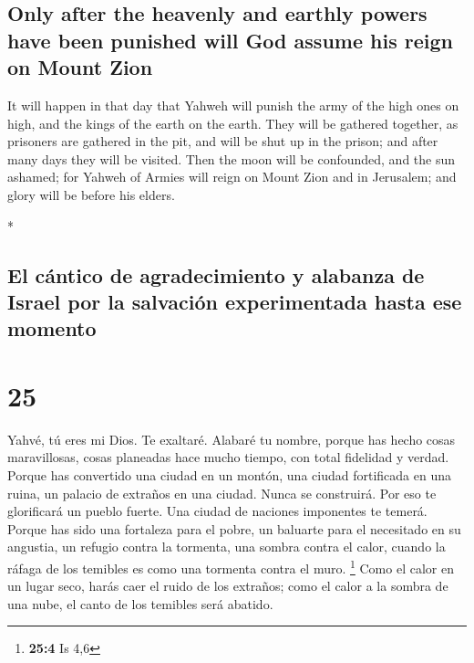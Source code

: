\begin{paracol}{2}
\begin{otherlanguage}{english}
\hypertarget{only-after-the-heavenly-and-earthly-powers-have-been-punished-will-god-assume-his-reign-on-mount-zion}{%
\subsection{Only after the heavenly and earthly powers have been
punished will God assume his reign on Mount
Zion}\label{only-after-the-heavenly-and-earthly-powers-have-been-punished-will-god-assume-his-reign-on-mount-zion}}

 It will happen in that day that Yahweh will punish the
army of the high ones on high, and the kings of the earth on the earth.
 They will be gathered together, as prisoners are
gathered in the pit, and will be shut up in the prison; and after many
days they will be visited.  Then the moon will be
confounded, and the sun ashamed; for Yahweh of Armies will reign on
Mount Zion and in Jerusalem; and glory will be before his elders.

\end{otherlanguage}

\switchcolumn[0]*

\hypertarget{el-cuxe1ntico-de-agradecimiento-y-alabanza-de-israel-por-la-salvaciuxf3n-experimentada-hasta-ese-momento}{%
\subsection{El cántico de agradecimiento y alabanza de Israel por la
salvación experimentada hasta ese
momento}\label{el-cuxe1ntico-de-agradecimiento-y-alabanza-de-israel-por-la-salvaciuxf3n-experimentada-hasta-ese-momento}}

\hypertarget{section-48}{%
\section{25}\label{section-48}}

 Yahvé, tú eres mi Dios. Te exaltaré. Alabaré tu nombre,
porque has hecho cosas maravillosas, cosas planeadas hace mucho tiempo,
con total fidelidad y verdad.  Porque has convertido una
ciudad en un montón, una ciudad fortificada en una ruina, un palacio de
extraños en una ciudad. Nunca se construirá.  Por eso te
glorificará un pueblo fuerte. Una ciudad de naciones imponentes te
temerá.  Porque has sido una fortaleza para el pobre, un
baluarte para el necesitado en su angustia, un refugio contra la
tormenta, una sombra contra el calor, cuando la ráfaga de los temibles
es como una tormenta contra el muro. \footnote{\textbf{25:4} Is 4,6}
 Como el calor en un lugar seco, harás caer el ruido de
los extraños; como el calor a la sombra de una nube, el canto de los
temibles será abatido.


\end{paracol}
